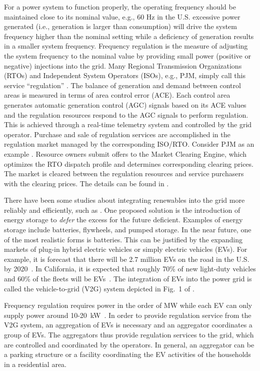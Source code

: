 \documentclass[journal]{IEEEtran}
\begin{document}
For a power system to function properly, the operating frequency should be maintained close to its nominal value, e.g., 60 Hz in the U.S. excessive power generated (i.e., generation is larger than consumption) will drive the system frequency higher than the nominal setting while a deficiency of generation results in a smaller system frequency. Frequency regulation is the measure of adjusting the system frequency to the nominal value by providing small power (positive or negative) injections into the grid. Many Regional Transmission Organizations (RTOs) and Independent System Operators (ISOs), e.g., PJM, simply call this service ``regulation'' \cite{PJM}.
The balance of generation and demand between control areas is measured in terms of area control error (ACE). Each control area generates automatic generation control (AGC) signals based on its ACE values and the regulation resources respond to the AGC signals to perform regulation. This is achieved through a real-time telemetry system and controlled by the grid operator.
Purchase and sale of regulation services are accomplished in the regulation market managed by the corresponding ISO/RTO. Consider PJM as an example \cite{PJM}. Resource owners submit offers to the Market Clearing Engine, which optimizes the RTO dispatch profile and determines corresponding clearing prices. The market is cleared between the regulation resources and service purchasers with the clearing prices. The details can be found in \cite{PJM,AGC,iagc}.



There have been some studies about integrating renewables into the grid more
reliably and efficiently, such as \cite{sellingwind}.  One proposed solution
is the introduction of energy storage to \emph{defer} the excess for the
future deficient.  Examples of energy storage include batteries, flywheels, and
pumped storage.  In the near future, one of the most realistic forms is
batteries.  This can be justified by the expanding markets of plug-in hybrid
electric vehicles or simply electric vehicles (EVs).  For example, it is
forecast that there will be 2.7 million EVs on the road in the U.S. by
2020~\cite{evnum}.  In California, it is expected that roughly 70\% of new
light-duty vehicles and 60\% of the fleets will be EVs~\cite{CA2011energy}.  
The integration of EVs into the power grid is called the vehicle-to-grid (V2G)
system depicted in Fig.~1 of \cite{smartgridcomm2012}.






Frequency regulation requires power in the order of MW while each EV can only supply
power around 10-20~kW~\cite{battery}.  In order to provide regulation service
from the V2G system, an aggregation of EVs is necessary and an aggregator
coordinates a group of EVs.  The aggregators thus provide regulation services
to the grid, which are controlled and coordinated by the operators.  In
general, an aggregator can be a parking structure or a facility
coordinating the EV activities of the households in a residential area.
\end{document}
